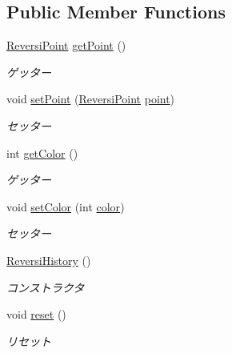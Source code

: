 \subsection*{Public Member Functions}
\begin{DoxyCompactItemize}
\item 
\hyperlink{classjp_1_1gr_1_1java__conf_1_1yuta__yoshinaga_1_1reversi_1_1model_1_1_reversi_point}{Reversi\+Point} \hyperlink{classjp_1_1gr_1_1java__conf_1_1yuta__yoshinaga_1_1reversi_1_1model_1_1_reversi_history_a108f7d23cbfcd1466c954123a3d8109c}{get\+Point} ()
\begin{DoxyCompactList}\small\item\em ゲッター \end{DoxyCompactList}\item 
void \hyperlink{classjp_1_1gr_1_1java__conf_1_1yuta__yoshinaga_1_1reversi_1_1model_1_1_reversi_history_a328707ab9f3e9b711633ee65951ca89d}{set\+Point} (\hyperlink{classjp_1_1gr_1_1java__conf_1_1yuta__yoshinaga_1_1reversi_1_1model_1_1_reversi_point}{Reversi\+Point} \hyperlink{classjp_1_1gr_1_1java__conf_1_1yuta__yoshinaga_1_1reversi_1_1model_1_1_reversi_history_a7f31cdd1562de0a3a73ba2298f030072}{point})
\begin{DoxyCompactList}\small\item\em セッター \end{DoxyCompactList}\item 
int \hyperlink{classjp_1_1gr_1_1java__conf_1_1yuta__yoshinaga_1_1reversi_1_1model_1_1_reversi_history_a43629f8c4c3be927d687f174978f204d}{get\+Color} ()
\begin{DoxyCompactList}\small\item\em ゲッター \end{DoxyCompactList}\item 
void \hyperlink{classjp_1_1gr_1_1java__conf_1_1yuta__yoshinaga_1_1reversi_1_1model_1_1_reversi_history_a8584f37692c128381951ddc55d551d59}{set\+Color} (int \hyperlink{classjp_1_1gr_1_1java__conf_1_1yuta__yoshinaga_1_1reversi_1_1model_1_1_reversi_history_a309884e0e91f9573f9a63f000380fc23}{color})
\begin{DoxyCompactList}\small\item\em セッター \end{DoxyCompactList}\item 
\hyperlink{classjp_1_1gr_1_1java__conf_1_1yuta__yoshinaga_1_1reversi_1_1model_1_1_reversi_history_abd0f556489e10b58555304449c6c2682}{Reversi\+History} ()
\begin{DoxyCompactList}\small\item\em コンストラクタ \end{DoxyCompactList}\item 
void \hyperlink{classjp_1_1gr_1_1java__conf_1_1yuta__yoshinaga_1_1reversi_1_1model_1_1_reversi_history_aee0155159a017671c2b18c1d8229d8d1}{reset} ()
\begin{DoxyCompactList}\small\item\em リセット \end{DoxyCompactList}\end{DoxyCompactItemize}
